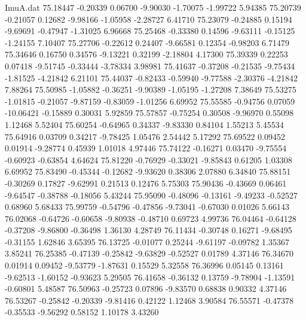 \begin{filecontents}{ImuA.dat}
  75.18447   -0.20339    0.06700   -9.90030   -1.70075   -1.99722    5.94385
  75.20739   -0.21057    0.12682   -9.98166   -1.05958   -2.28727    6.41710
  75.23079   -0.24885    0.15194   -9.69691   -0.47947   -1.31025    6.96668
  75.25468   -0.33380    0.14596   -9.63111   -0.15125   -1.24155    7.10407
  75.27706   -0.22612    0.24407   -9.66581    0.12354   -0.98203    6.71479
  75.34646    0.16750    0.34576   -9.13221    0.32199   -2.18804    4.17300
  75.39339    0.22253    0.07418   -9.51745   -0.33444   -3.78334    3.98981
  75.41637   -0.37208   -0.21535   -9.75434   -1.81525   -4.21842    6.21101
  75.44037   -0.82433   -0.59940   -9.77588   -2.30376   -4.21842    7.88264
  75.50985   -1.05882   -0.36251   -9.90389   -1.05195   -1.27208    7.38649
  75.53275   -1.01815   -0.21057   -9.87159   -0.83059   -1.01256    6.69952
  75.55585   -0.94756    0.07059  -10.06421   -0.15889    0.30031    5.92859
  75.57857   -0.75254    0.30508   -9.96970    0.55098    1.12468    5.52404
  75.60254   -0.64965    0.34337   -9.83330    0.84104    1.55213    5.45534
  75.64916    0.03709    0.34217   -9.78425    1.05476    2.54442    5.17292
  75.69522    0.09452    0.01914   -9.28774    0.45939    1.01018    4.97446
  75.74122   -0.16271    0.03470   -9.75554   -0.60923   -0.63854    4.64624
  75.81220   -0.76929   -0.33021   -9.85843    0.61205    1.03308    6.69952
  75.83490   -0.45344   -0.12682   -9.93620    0.38306    2.07880    6.34840
  75.88151   -0.30269    0.17827   -9.62991    0.21513    0.12476    5.75303
  75.90436   -0.43669    0.06461   -9.64547   -0.38788   -0.18056    5.43244
  75.95090   -0.48096   -0.13161   -9.49233   -0.52527    0.68960    5.68433
  75.99759   -0.54796   -0.47856   -9.73041   -0.67030    0.01026    5.66143
  76.02068   -0.64726   -0.60658   -9.80938   -0.48710    0.69723    4.99736
  76.04464   -0.64128   -0.37208   -9.86800   -0.36498    1.36130    4.28749
  76.11434   -0.30748    0.16271   -9.68495   -0.31155    1.62846    3.65395
  76.13725   -0.01077    0.25244   -9.61197   -0.09782    1.35367    3.85241
  76.25385   -0.47139   -0.25842   -9.63829   -0.52527    0.01789    4.37146
  76.34670    0.01914    0.09452   -9.53779   -1.87631    0.15529    5.32558
  76.36996    0.05145    0.13161   -9.62513   -1.60152   -0.93623    5.29505
  76.41658   -0.36132    0.13759   -9.78904   -1.13591   -0.60801    5.48587
  76.50963   -0.25723    0.07896   -9.83570    0.68838    0.90332    4.37146
  76.53267   -0.25842   -0.20339   -9.81416    0.42122    1.12468    3.90584
  76.55571   -0.47378   -0.35533   -9.56292    0.58152    1.10178    3.43260

\end{filecontents}
